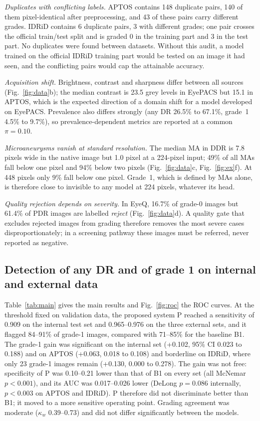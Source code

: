 \documentclass[11pt,a4paper]{article}
\begin{document}
\emph{Duplicates with conflicting labels.} APTOS contains 148 duplicate pairs, 140 of them pixel-identical after preprocessing, and 43 of these pairs carry different grades. IDRiD contains 6 duplicate pairs, 3 with different grades; one pair crosses the official train/test split and is graded 0 in the training part and 3 in the test part. No duplicates were found between datasets. Without this audit, a model trained on the official IDRiD training part would be tested on an image it had seen, and the conflicting pairs would cap the attainable accuracy.

\emph{Acquisition shift.} Brightness, contrast and sharpness differ between all sources (Fig.~\ref{fig:data}b); the median contrast is 23.5 grey levels in EyePACS but 15.1 in APTOS, which is the expected direction of a domain shift for a model developed on EyePACS. Prevalence also differs strongly (any DR 26.5\% to 67.1\%, grade~1 4.5\% to 9.7\%), so prevalence-dependent metrics are reported at a common $\pi=0.10$.

\emph{Microaneurysms vanish at standard resolution.} The median MA in DDR is 7.8 pixels wide in the native image but 1.0 pixel at a 224-pixel input; 49\% of all MAs fall below one pixel and 94\% below two pixels (Fig.~\ref{fig:data}c, Fig.~\ref{fig:ex}f). At 448 pixels only 9\% fall below one pixel. Grade~1, which is defined by MAs alone, is therefore close to invisible to any model at 224 pixels, whatever its head.

\emph{Quality rejection depends on severity.} In EyeQ, 16.7\% of grade-0 images but 61.4\% of PDR images are labelled \emph{reject} (Fig.~\ref{fig:data}d). A quality gate that excludes rejected images from grading therefore removes the most severe cases disproportionately; in a screening pathway these images must be referred, never reported as negative.
\subsection{Detection of any DR and of grade 1 on internal and external data}
Table~\ref{tab:main} gives the main results and Fig.~\ref{fig:roc} the ROC curves. At the threshold fixed on validation data, the proposed system P reached a sensitivity of 0.909 on the internal test set and 0.965--0.976 on the three external sets, and it flagged 84--91\% of grade-1 images, compared with 71--85\% for the baseline B1. The grade-1 gain was significant on the internal set (+0.102, 95\% CI 0.023 to 0.188) and on APTOS (+0.063, 0.018 to 0.108) and borderline on IDRiD, where only 23 grade-1 images remain (+0.130, 0.000 to 0.278). The gain was not free: specificity of P was 0.10--0.21 lower than that of B1 on every set (all McNemar $p<0.001$), and its AUC was 0.017--0.026 lower (DeLong $p=0.086$ internally, $p<0.003$ on APTOS and IDRiD). P therefore did not discriminate better than B1; it moved to a more sensitive operating point. Grading agreement was moderate ($\kappa_w$ 0.39--0.73) and did not differ significantly between the models.
\end{document}
